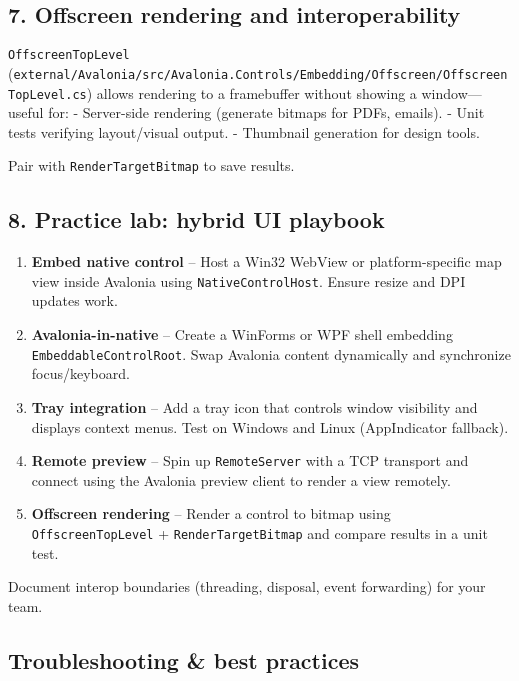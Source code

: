 \subsection{7. Offscreen rendering and
interoperability}\label{offscreen-rendering-and-interoperability}

\passthrough{\lstinline!OffscreenTopLevel!}
(\passthrough{\lstinline!external/Avalonia/src/Avalonia.Controls/Embedding/Offscreen/OffscreenTopLevel.cs!})
allows rendering to a framebuffer without showing a window---useful for:
- Server-side rendering (generate bitmaps for PDFs, emails). - Unit
tests verifying layout/visual output. - Thumbnail generation for design
tools.

Pair with \passthrough{\lstinline!RenderTargetBitmap!} to save results.

\subsection{8. Practice lab: hybrid UI
playbook}\label{practice-lab-hybrid-ui-playbook}

\begin{enumerate}
\def\labelenumi{\arabic{enumi}.}
\tightlist
\item
  \textbf{Embed native control} -- Host a Win32 WebView or
  platform-specific map view inside Avalonia using
  \passthrough{\lstinline!NativeControlHost!}. Ensure resize and DPI
  updates work.
\item
  \textbf{Avalonia-in-native} -- Create a WinForms or WPF shell
  embedding \passthrough{\lstinline!EmbeddableControlRoot!}. Swap
  Avalonia content dynamically and synchronize focus/keyboard.
\item
  \textbf{Tray integration} -- Add a tray icon that controls window
  visibility and displays context menus. Test on Windows and Linux
  (AppIndicator fallback).
\item
  \textbf{Remote preview} -- Spin up
  \passthrough{\lstinline!RemoteServer!} with a TCP transport and
  connect using the Avalonia preview client to render a view remotely.
\item
  \textbf{Offscreen rendering} -- Render a control to bitmap using
  \passthrough{\lstinline!OffscreenTopLevel!} +
  \passthrough{\lstinline!RenderTargetBitmap!} and compare results in a
  unit test.
\end{enumerate}

Document interop boundaries (threading, disposal, event forwarding) for
your team.

\subsection{Troubleshooting \& best
practices}\label{troubleshooting-best-practices-6}

